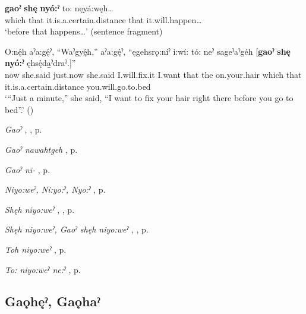 \ea
\label{ex:gpart39}
\gll \textbf{gaoˀ} \textbf{shę} \textbf{nyó:ˀ} to: nęyá:węh…\\
which that it.is.a.certain.distance that it.will.happen…\\
\glt ‘before that happens…’ (sentence fragment)
\z


\ea
\label{ex:gpar40}
\gll O:nę́h aˀa:gę́ˀ, “Waˀgyę́h,” aˀa:gę́ˀ, “ęgehsrǫ:níˀ i:wí: tó: neˀ sageˀaˀgéh [\textbf{gaoˀ} \textbf{shę} \textbf{nyó:ˀ}  ęhsę́da̱ˀdraˀ.]”\\
now she.said just.now she.said I.will.fix.it I.want that the on.your.hair which that it.is.a.certain.distance you.will.go.to.bed\\
\glt ‘“Just a minute,” she said, “I want to fix your hair right there before you go to bed”.’ (\cite{henry_de_2005})
\z


\begin{CayugaRelated}
\item \textit{Gaoˀ} , , p. \pageref{p:[gaoˀ]}\\
\item \textit{Gaoˀ nawahtgeh} , p. \pageref{p:[gaoˀ nawahtgeh]}\\
\item \textit{Gaoˀ ni-} , p. \pageref{p:[gaoˀ ni-]}\\
\item \textit{Niyo:weˀ, Ni:yo:ˀ, Nyo:ˀ} , p. \pageref{p:[niyo:weˀ]}\\
\item \textit{Shęh niyo:weˀ} , , p. \pageref{p:[shęh niyo:weˀ]}\\
\item \textit{Shęh niyo:weˀ, Gaoˀ shęh niyo:weˀ} , , p. \pageref{p:[shęh niyo:weˀ, gaoˀ shęh niyo:weˀ]}\\
\item \textit{Toh niyo:weˀ} , p. \pageref{p:[toh niyo:weˀ]}\\
\item \textit{To: niyo:weˀ ne:ˀ} , p. \pageref{p:[to: niyo:weˀ ne:ˀ]}
\end{CayugaRelated}


\subsection*{\textbf{Gaǫhęˀ, Gaǫhaˀ} } \label{p:[gaǫhęˀ]}

